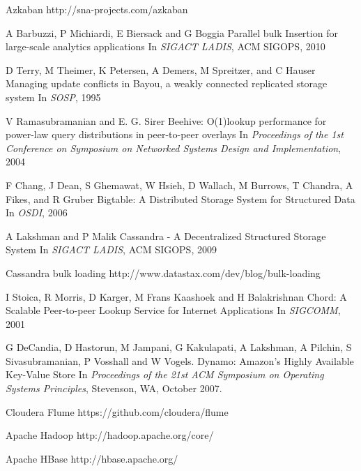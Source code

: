 \documentclass[10pt,twocolumn,preprint,natbib,authoryear]{sigplanconf}
\begin{document}
\begin{thebibliography}
\softraggedright

Azkaban
\newblock http://sna-projects.com/azkaban

A Barbuzzi, P Michiardi, E Biersack and G Boggia
\newblock Parallel bulk Insertion for large-scale analytics applications
\newblock In
\emph{SIGACT LADIS}, ACM SIGOPS, 2010

D Terry, M Theimer, K Petersen, A Demers, M Spreitzer, and C Hauser
\newblock Managing update conflicts in Bayou, a weakly connected replicated storage system
\newblock In
\emph{SOSP}, 1995

V Ramasubramanian and E. G. Sirer
\newblock Beehive: O(1)lookup performance for power-law query distributions in peer-to-peer overlays
\newblock In
\emph{Proceedings of the 1st Conference on Symposium on Networked Systems Design and Implementation}, 2004

F Chang, J Dean, S Ghemawat, W Hsieh, D Wallach, M Burrows, T Chandra, A Fikes, and R Gruber
\newblock Bigtable: A Distributed Storage System for Structured Data
\newblock In
\emph{OSDI}, 2006

A Lakshman and P Malik
\newblock Cassandra - A Decentralized Structured Storage System
\newblock In
\emph{SIGACT LADIS}, ACM SIGOPS, 2009

Cassandra bulk loading
\newblock http://www.datastax.com/dev/blog/bulk-loading

I Stoica, R Morris, D Karger, M Frans Kaashoek and H Balakrishnan
\newblock Chord: A Scalable Peer-to-peer Lookup Service for Internet Applications
\newblock In
\emph{SIGCOMM}, 2001

G DeCandia, D Hastorun, M Jampani, G Kakulapati, A Lakshman, A Pilchin, S Sivasubramanian, P Vosshall and W Vogels.
\newblock Dynamo: Amazon's Highly Available Key-Value Store
\newblock In 
\emph{Proceedings of the 21st ACM Symposium on Operating Systems Principles}, Stevenson, WA, October 2007.

Cloudera Flume
\newblock https://github.com/cloudera/flume

Apache Hadoop
\newblock http://hadoop.apache.org/core/

Apache HBase
\newblock http://hbase.apache.org/


\end{thebibliography}
\end{document}
